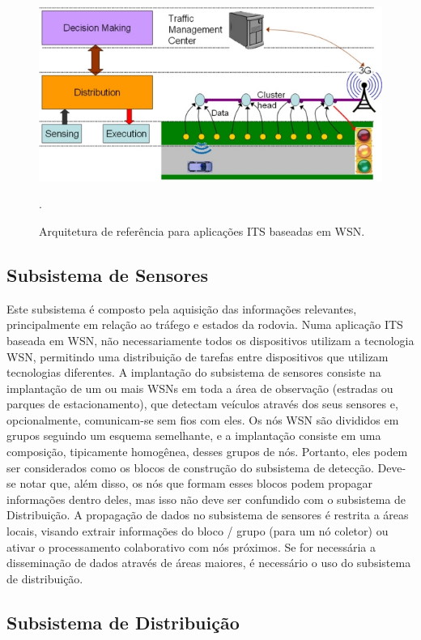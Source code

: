 \documentclass[
	12pt,				%
	oneside,			%
	a4paper,			%
	english,			%
	brazil				%
	]{abntex2ppgsi}
\begin{document}
\begin{figure} [t]
	\centering
	\includegraphics[width=0.8\columnwidth]{images/camadas_wsn.jpg}
	\caption{Arquitetura de referência para aplicações ITS baseadas em WSN. \cite{losilla2011comprehensive}}.
	\label{fig:arquiteturas_its_wsn}
\end{figure}

\subsection{Subsistema de Sensores}

Este subsistema é composto pela aquisição das informações relevantes, principalmente em relação ao tráfego e estados da rodovia. Numa aplicação ITS baseada em WSN, não necessariamente todos os dispositivos utilizam a tecnologia WSN, permitindo uma distribuição de tarefas entre dispositivos que utilizam tecnologias diferentes. A implantação do subsistema de sensores consiste na implantação de um ou mais WSNs em toda a área de observação (estradas ou parques de estacionamento), que detectam veículos através dos seus sensores e, opcionalmente, comunicam-se sem fios com eles. Os nós WSN são divididos em grupos seguindo um esquema semelhante, e a implantação consiste em uma composição, tipicamente homogênea, desses grupos de nós. Portanto, eles podem ser considerados como os blocos de construção do subsistema de detecção. Deve-se notar que, além disso, os nós que formam esses blocos podem propagar informações dentro deles, mas isso não deve ser confundido com o subsistema de Distribuição. A propagação de dados no subsistema de sensores é restrita a áreas locais, visando extrair informações do bloco / grupo (para um nó coletor) ou ativar o processamento colaborativo com nós próximos. Se for necessária a disseminação de dados através de áreas maiores, é necessário o uso do subsistema de distribuição.
\subsection{Subsistema de Distribuição}
\end{document}
